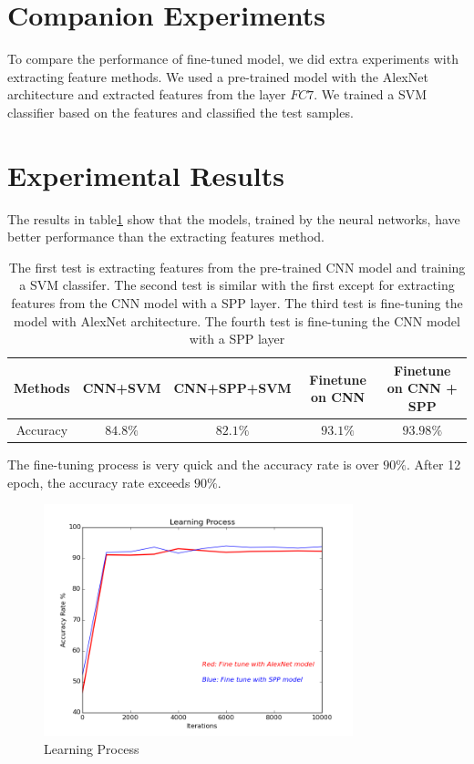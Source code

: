 \section{Companion Experiments}

To compare the performance of fine-tuned model, we did extra experiments with extracting feature methods. We used a pre-trained model with the AlexNet architecture and extracted features from the layer $FC7$. We trained a SVM classifier based on the features and classified the test samples.

\section{Experimental Results}

The results in table\ref{ExpRes} show that the models, trained by the neural networks, have better performance than the extracting features method. 

\begin{table}[h]
\begin{center}
    \begin{tabular}{| c | c | c | c | c |}
    \hline
    Methods & CNN+SVM & CNN+SPP+SVM & Finetune on CNN & Finetune on CNN + SPP  \\ \hline
    Accuracy & $84.8\%$ & $82.1\%$ & $93.1\%$ & $93.98\%$ \\ \hline
    \end{tabular}
    \caption{The first test is extracting features from the pre-trained CNN model and training a SVM classifer. The second test is similar with the first except for extracting features from the CNN model with a SPP layer. The third test is fine-tuning the model with AlexNet architecture. The fourth test is fine-tuning the CNN model with a SPP layer}
    \label{ExpRes}
\end{center}
\end{table}

The fine-tuning process is very quick and the accuracy rate is over $90\%$. After 12 epoch, the accuracy rate exceeds $90\%$. 
\graphicspath{ {./Figures/} }
\begin{figure}[!htb]
    \centering
	\includegraphics[width=0.8\textwidth]{FinetuneAccuracy.png}
    \caption{Learning Process}%
    \label{fig:finetuneprocess}%
\end{figure}

